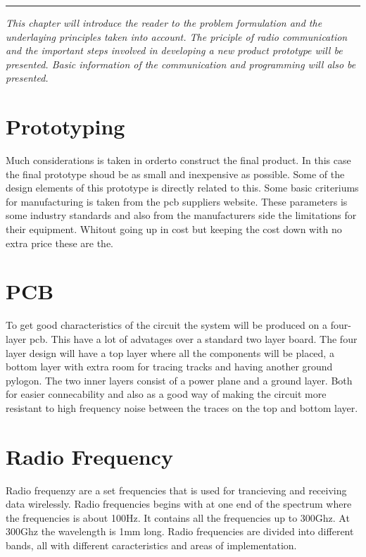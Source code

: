\vspace{-10ex}%
\rule{\textwidth}{0.3pt}
\vspace{5ex}

\textit{
This chapter will introduce the reader to the problem formulation and the underlaying principles taken into account. The priciple of radio communication and the important steps involved in developing a new product prototype will be presented. Basic information of the communication and programming will also be presented. 
}
\vspace{5ex}



\section{Prototyping}
Much considerations is taken in orderto construct the final product. In this case the final prototype shoud be as small and inexpensive as possible. Some of the design elements of this prototype is directly related to this. Some basic criteriums for manufacturing is taken from the \gls{pcb} suppliers website. These parameters is some industry standards and also from the manufacturers side the limitations for their equipment. Whitout going up in cost but keeping the cost down with no extra price these are the.



\section{PCB}
To get good characteristics of the circuit the system will be produced on a four-layer \gls{pcb}. This have a lot of advatages over a standard two layer board. The four layer design will have a top layer where all the components will be placed, a bottom layer with extra room for tracing tracks and having another ground pylogon. The two inner layers consist of a power plane and a ground layer. Both for easier connecability and also as a good way of making the circuit more resistant to high frequency noise between the traces on the top and bottom layer.



\section{Radio Frequency}
Radio frequenzy are a set frequencies that is used for trancieving and receiving data wirelessly. Radio frequencies begins with at one end of the spectrum where the frequencies is about 100Hz. It contains all the frequencies up to 300Ghz. At 300Ghz the wavelength is 1mm long. Radio frequencies are divided into different bands, all with different caracteristics and areas of implementation. 

